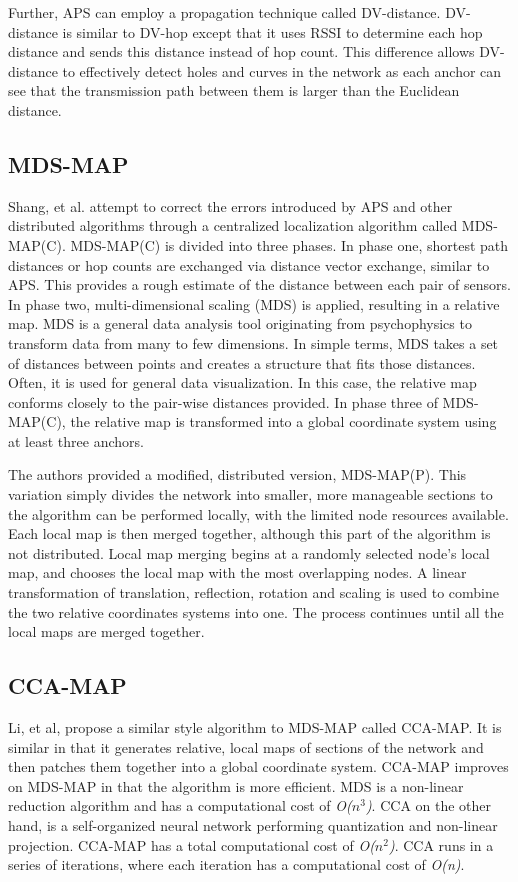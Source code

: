 Further, APS can employ a propagation technique called DV-distance.  DV-distance is similar to DV-hop except that it uses RSSI to determine each hop distance and sends this distance instead of hop count.  This difference allows DV-distance to effectively detect holes and curves in the network as each anchor can see that the transmission path between them is larger than the Euclidean distance.

\subsection{MDS-MAP}
Shang, et al. attempt to correct the errors introduced by APS and other distributed algorithms through a centralized localization algorithm called MDS-MAP(C)\cite{MDS-MAP}.  MDS-MAP(C) is divided into three phases.  In phase one, shortest path distances or hop counts are exchanged via distance vector exchange, similar to APS.  This provides a rough estimate of the distance between each pair of sensors.  In phase two, multi-dimensional scaling (MDS) is applied, resulting in a relative map.  MDS is a general data analysis tool originating from psychophysics to transform data from many to few dimensions.  In simple terms, MDS takes a set of distances between points and creates a structure that fits those distances.  Often, it is used for general data visualization.  In this case, the relative map conforms closely to the pair-wise distances provided.  In phase three of MDS-MAP(C), the relative map is transformed into a global coordinate system using at least three anchors.  

The authors provided a modified, distributed version, MDS-MAP(P)\cite{MDS-MAP-P}.  This variation simply divides the network into smaller, more manageable sections to the algorithm can be performed locally, with the limited node resources available.  Each local map is then merged together, although this part of the algorithm is not distributed.  Local map merging begins at a randomly selected node's local map, and chooses the local map with the most overlapping nodes.  A linear transformation of translation, reflection, rotation and scaling is used to combine the two relative coordinates systems into one.  The process continues until all the local maps are merged together. 

\subsection{CCA-MAP} \label{sec:CCA-MAP}
Li, et al, propose a similar style algorithm to MDS-MAP called CCA-MAP\cite{CCA-MAP07,CCA-MAP09}.  It is similar in that it generates relative, local maps of sections of the network and then patches them together into a global coordinate system.  CCA-MAP improves on MDS-MAP in that the algorithm is more efficient.  MDS is a non-linear reduction algorithm and has a computational cost of \emph{O($n^{3}$)}.  CCA\cite{CCA} on the other hand, is a self-organized neural network performing quantization and non-linear projection.  CCA-MAP has a total computational cost of \emph{O($n^{2}$)}.  CCA runs in a series of iterations, where each iteration has a computational cost of \emph{O(n)}.

